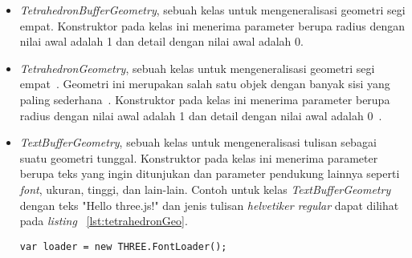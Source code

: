 \begin{itemize}
\begin{itemize}
		\item {\it TetrahedronBufferGeometry}, sebuah kelas untuk mengeneralisasi geometri segi empat. Konstruktor pada kelas ini menerima parameter berupa radius dengan nilai awal adalah 1 dan detail dengan nilai awal adalah 0.
		\item {\it TetrahedronGeometry}, sebuah kelas untuk mengeneralisasi geometri segi empat~\cite{threejs}. Geometri ini merupakan salah satu objek dengan banyak sisi yang paling sederhana~\cite{learningThreejs}. Konstruktor pada kelas ini menerima parameter berupa radius dengan nilai awal adalah 1 dan detail dengan nilai awal adalah 0~\cite{threejs}.
		\item {\it TextBufferGeometry}, sebuah kelas untuk mengeneralisasi tulisan sebagai suatu geometri tunggal. Konstruktor pada kelas ini menerima parameter berupa teks yang ingin ditunjukan dan parameter pendukung lainnya seperti {\it font}, ukuran, tinggi, dan lain-lain. Contoh untuk kelas {\it TextBufferGeometry} dengan teks "Hello three.js!" dan jenis tulisan {\it helvetiker regular} dapat dilihat pada {\it listing} ~\ref{lst:tetrahedronGeo}.
\begin{lstlisting}[caption={Contoh penggunaan kelas {\it TextBufferGeometry}.}, label={lst:tetrahedronGeo},captionpos=b]
var loader = new THREE.FontLoader();


\end{lstlisting}
\end{itemize}
\end{itemize}
